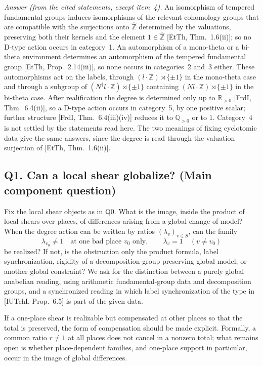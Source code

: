 \documentclass[11pt]{article}
\theoremstyle{definition}
\begin{document}
\emph{Answer (from the cited statements, except item~4).}  An
isomorphism of tempered fundamental groups induces isomorphisms of
the relevant cohomology groups that are compatible with the
surjections onto $\widehat{\mathbb Z}$ determined by the valuations,
preserving both their kernels and the element
$1\in\widehat{\mathbb Z}$ [EtTh, Thm.~1.6(ii)]; so no D-type action
occurs in category~1.  An automorphism of a mono-theta or a bi-theta
environment determines an automorphism of the tempered fundamental
group [EtTh, Prop.~2.14(iii)], so none occurs in categories~2 and~3
either.  These automorphisms act on the labels, through
$(l\cdot\mathbb Z)\rtimes\{\pm1\}$ in the mono-theta case and through
a subgroup of $(N^\dagger l\cdot\mathbb Z)\rtimes\{\pm1\}$ containing
$(Nl\cdot\mathbb Z)\rtimes\{\pm1\}$ in the bi-theta case.  After
realification the degree is determined only up to $\mathbb R_{>0}$
[FrdI, Thm.~6.4(ii)], so a D-type action occurs in category~5, by
one positive scalar; further structure [FrdI, Thm.~6.4(iii)(iv)]
reduces it to $\mathbb Q_{>0}$ or to $1$.  Category~4 is not settled
by the statements read here.  The two meanings of fixing cyclotomic
data give the same answers, since the degree is read through the
valuation surjection of [EtTh, Thm.~1.6(ii)].

\subsection*{Q1. Can a local shear globalize? (Main component question)}

Fix the local shear objects as in Q0.  What is the image, inside
the product of local shears over places, of differences arising
from a global change of model?  When the degree action can be
written by ratios $(\lambda_v)_{v\in S}$, can the family
\[
\lambda_{v_0}\ne1\quad\text{at one bad place \(v_0\) only},\qquad
\lambda_v=1\quad(v\ne v_0)
\]
be realized?  If not, is the obstruction only the product
formula, label synchronization, rigidity of a decomposition-group
preserving global model, or another global constraint?  We ask
for the distinction between a purely global anabelian reading,
using arithmetic fundamental-group data and decomposition groups,
and a synchronized reading in which label synchronization of the
type in [IUTchI, Prop.~6.5] is part of the given data.

If a one-place shear is realizable but compensated at other
places so that the total is preserved, the form of compensation
should be made explicit.  Formally, a common ratio $r\ne1$ at
all places does not cancel in a nonzero total; what remains open
is whether place-dependent families, and one-place support in
particular, occur in the image of global differences.
\end{document}

